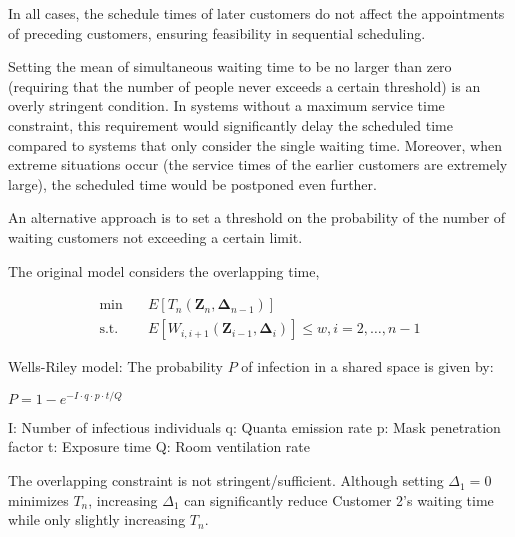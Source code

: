\documentclass{article}
\newcommand{\Z}{\mathbf{Z}}
\newcommand{\D}{\bm{\Delta}}
\begin{document}
In all cases, the schedule times of later customers do not affect the appointments of preceding customers, ensuring feasibility in sequential scheduling.

Setting the mean of simultaneous waiting time to be no larger than zero (requiring that the number of people never exceeds a certain threshold) is an overly stringent condition. In systems without a maximum service time constraint, this requirement would significantly delay the scheduled time compared to systems that only consider the single waiting time. Moreover, when extreme situations occur (the service times of the earlier customers are extremely large), the scheduled time would be postponed even further.

An alternative approach is to set a threshold on the probability of the number of waiting customers not exceeding a certain limit.


The original model considers the overlapping time,

\begin{equation}\label{single_overlap}
    \begin{aligned}
        \min \quad & E[T_{n}(\Z_{n}, \D_{n-1})] \\
        \mbox{s.t.} \quad & E[W_{i,i+1}(\Z_{i-1}, \D_{i})] \leq w, i=2,\ldots, n-1
    \end{aligned}
\end{equation}

Wells-Riley model: The probability $P$ of infection in a shared space is given by:

$P=1-e^{-I \cdot q \cdot p \cdot t / Q}$

I: Number of infectious individuals
q: Quanta emission rate
p: Mask penetration factor
t: Exposure time
Q: Room ventilation rate

The overlapping constraint is not stringent/sufficient. Although setting $\Delta_1 = 0$ minimizes $T_n$, increasing $\Delta_1$ can significantly reduce Customer 2's waiting time while only slightly increasing $T_n$.
\end{document}
